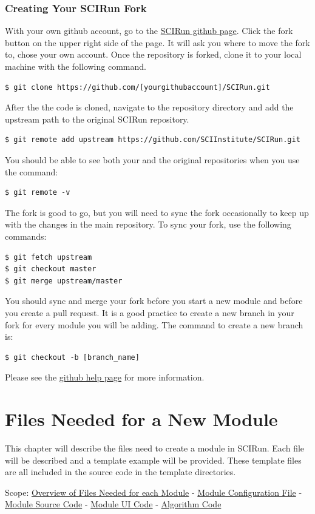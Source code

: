 \documentclass[fleqn,11pt,openany]{book}
\begin{document}
\subsection{Creating Your SCIRun Fork}
\label{sec:forking}

With your own github account, go to the \href{https://github.com/SCIInstitute/SCIRun}{SCIRun github page}.
Click the fork button on the upper right side of the page.  
It will ask you where to move the fork to, chose your own account.  
Once the repository is forked, clone it to your local machine with the following command.  
\begin{verbatim}
$ git clone https://github.com/[yourgithubaccount]/SCIRun.git
\end{verbatim}
After the the code is cloned, navigate to the repository directory and add the upstream path to the original SCIRun repository.
\begin{verbatim}
$ git remote add upstream https://github.com/SCIInstitute/SCIRun.git
\end{verbatim}
You should be able to see both your and the original repositories when you use the command:
\begin{verbatim}
$ git remote -v
\end{verbatim}
The fork is good to go, but you will need to sync the fork occasionally to keep up with the changes in the main repository.  To sync your fork, use the following commands:
\begin{verbatim}
$ git fetch upstream
$ git checkout master
$ git merge upstream/master
\end{verbatim}
You should sync and merge your fork before you start a new module and before you create a pull request.  
It is a good practice to create a new branch in your fork for every module you will be adding.  The command to create a new branch is:
\begin{verbatim}
$ git checkout -b [branch_name]
\end{verbatim}
Please see the \href{https://help.github.com}{github help page} for more information.



\chapter{Files Needed for a New Module}
\label{sec:files}

\begin{introduction}
This chapter will describe the files need to create a module in SCIRun.
Each file will be described and a template example will be provided. 
These template files are all included in the source code in the template directories.

Scope: \hyperref[sec:overview]{Overview of Files Needed for each Module} - \hyperref[sec:config]{Module Configuration File} -
\hyperref[sec:module]{Module Source Code} - \hyperref[sec:ui]{Module UI Code}  - \hyperref[sec:algo]{Algorithm Code}
\end{introduction}
\end{document}
